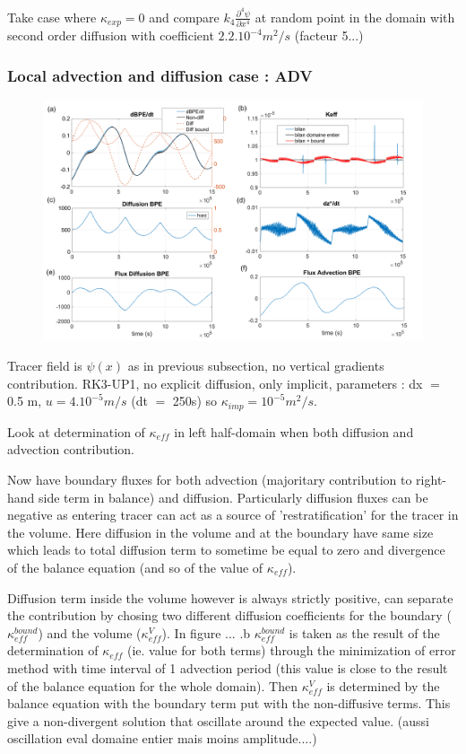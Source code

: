 Take case where $\kappa_{exp}=0$ and compare $k_4 \frac{\partial^4 \psi}{\partial x^4}$ at random point in the domain with second order diffusion with coefficient $2.2 . 10^{-4} m^2/s$ (facteur 5...)

\subsubsection{Local advection and diffusion case : ADV}

\begin{figure}[h!]
\centering
\includegraphics[width=1\textwidth]{./CHAP_BPE/AGBPE_numlab4.png}
\caption{}
\label{fig4numlab}
\end{figure}

Tracer field is $\psi(x)$ as in previous subsection, no vertical gradients contribution. RK3-UP1, no explicit diffusion, only implicit, parameters : dx $=$ 0.5 m, $u=4.10^{-5} m/s$ (dt $=$ 250s) so $\kappa_{imp} = 10^{-5} m^2/s$.


 Look at determination of $\kappa_{eff}$ in left half-domain when both diffusion and advection contribution.
 
 Now have boundary fluxes for both advection (majoritary contribution to right-hand side term in balance) and diffusion. Particularly diffusion fluxes can be negative as entering tracer can act as a source of 'restratification' for the tracer in the volume. Here diffusion in the volume and at the boundary have same size which leads to total diffusion term to sometime be equal to zero and divergence of the balance equation (and so of the value of $\kappa_{eff}$). 
 
 Diffusion term inside the volume however is always strictly positive, can separate the contribution by chosing two different diffusion coefficients for the boundary ($\kappa_{eff}^{bound}$) and the volume ($\kappa_{eff}^{V}$). In figure ... .b $\kappa_{eff}^{bound}$ is taken as the result of the determination of $\kappa_{eff}$ (ie. value for both terms) through the minimization of error method with time interval of 1 advection period (this value is close to the result of the balance equation for the whole domain). Then $\kappa_{eff}^{V}$ is determined by the balance equation with the boundary term put with the non-diffusive terms. This give a non-divergent solution that oscillate around the expected value. (aussi oscillation eval domaine entier mais moins amplitude....)
 
